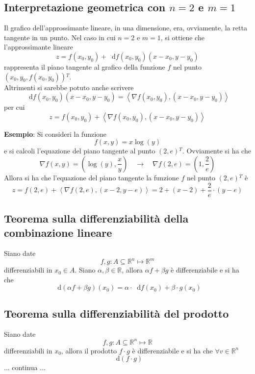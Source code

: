 \documentclass[a4paper]{extarticle}
\newcommand*\dif{\mathop{}\!\mathrm{d}}
\begin{document}
\vspace{1em}
\noindent
\subsection{Interpretazione geometrica con $n=2$ e $m=1$}
Il grafico dell'approssimante lineare, in una dimensione, era, ovviamente, la retta tangente in un punto. Nel caso in cui $n=2$ e $m=1$, si ottiene che l'approssimante lineare
\[z=f(x_0,y_0) + \dif f(x_0,y_0)(x-x_0,y-y_0)\]
rappresenta il piano tangente al grafico della funzione $f$ nel punto $\left(x_0,y_0,f(x_0,y_0)\right){^T}$.\\
Altrimenti si sarebbe potuto anche scrivere
\[\dif f(x_0,y_0)(x-x_0,y-y_0) = \left<\nabla f(x_0,y_0), (x-x_0,y-y_0)\right>\]
per cui
\[z=f(x_0,y_0)+\left<\nabla f(x_0,y_0), (x-x_0,y-y_0)\right>\]

\vspace{2em}
\noindent
\textbf{Esempio}: Si consideri la funzione
\[f(x,y)=x \log(y)\]
e si calcoli l'equazione del piano tangente al punto $(2,e){^T}$. Ovviamente si ha che
\[\nabla f(x,y) = \left(\log(y),\frac{x}{y}\right) \hspace{1em} \rightarrow \hspace{1em} \nabla f(2,e) = \left(1,\frac{2}{e}\right)\]
Allora si ha che l'equazione del piano tangente la funzione $f$ nel punto $(2,e){^T}$ è
\[z=f(2,e) + \left<\nabla f(2,e), (x-2,y-e)\right> = 2+(x-2)+\dfrac{2}{e} \cdot (y-e)\]

\vspace{1em}
\noindent
\subsection{Teorema sulla differenziabilità della combinazione lineare}
Siano date
\[f,g : A \subseteq \mathbb{R}^n \longmapsto \mathbb{R}^m\]
differenziabili in $x_0 \in A$. Siano $\alpha, \beta \in \mathbb{R}$, allora $\alpha f + \beta g$ è differenziabile e si ha che
\[\dif \left(\alpha f + \beta g\right)(x_0) = \alpha \cdot \dif f(x_0) + \beta \cdot g(x_0)\]

\vspace{1em}
\noindent
\subsection{Teorema sulla differenziabilità del prodotto}
Siano date
\[f,g : A \subseteq \mathbb{R}^n \longmapsto \mathbb{R}\]
differenziabili in $x_0$, allora il prodotto $f \cdot g$ è differenziabile e si ha che $\forall v \in \mathbb{R}^n$
\[\dif (f \cdot g)\]
... continua ...
\end{document}
